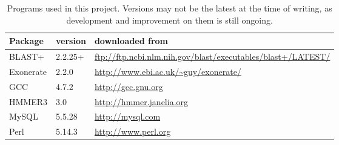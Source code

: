 \begin{table}
	\caption[Programs used in this project]{Programs used in this project. Versions may not be the latest at the time of writing, as development and improvement on them is still ongoing.}
	\begin{tabularx}{\textwidth}{p{} p{} p{}}
	\hline
	Package   & version & downloaded from \\
	\hline
	BLAST+    & 2.2.25+ & \url{ftp://ftp.ncbi.nlm.nih.gov/blast/executables/blast+/LATEST/} \\
	Exonerate & 2.2.0   & \url{http://www.ebi.ac.uk/~guy/exonerate/} \\
	GCC       & 4.7.2   & \url{http://gcc.gnu.org} \\
	HMMER3    & 3.0     & \url{http://hmmer.janelia.org} \\
	MySQL     & 5.5.28  & \url{http://mysql.com} \\
	Perl      & 5.14.3  & \url{http://www.perl.org} \\
	\end{tabularx}
	\label{tab:programs}
\end{table}
